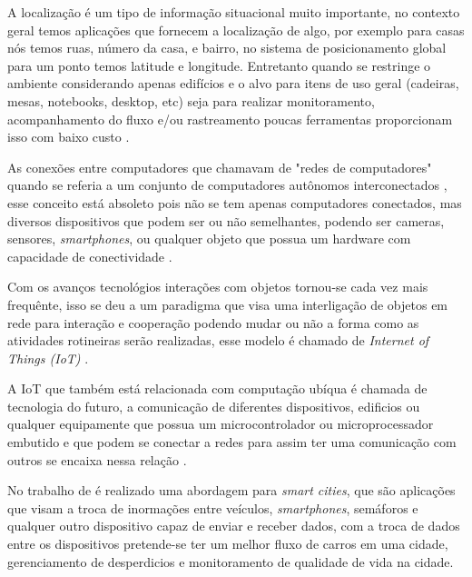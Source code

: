 
A localização é um tipo de informação situacional muito importante, no contexto geral temos aplicações que fornecem a localização de algo, por exemplo para casas nós temos ruas, número da casa, e bairro, no sistema de posicionamento global para um ponto temos  latitude e longitude. Entretanto quando se restringe o ambiente considerando apenas edifícios e o alvo para itens de uso geral (cadeiras, mesas, notebooks, desktop, etc) seja para realizar monitoramento, acompanhamento do fluxo e/ou rastreamento poucas ferramentas proporcionam isso com baixo custo \cite{rfid2009review}.


As  conexões entre computadores que chamavam de 
"redes de computadores" quando se referia a um conjunto de computadores autônomos interconectados \cite{tenenbaum2002}, 
esse conceito está absoleto pois não se tem apenas computadores conectados, mas diversos dispositivos que podem ser ou 
não semelhantes, podendo ser cameras, sensores, \textit{smartphones}, ou qualquer objeto que possua um 
hardware com capacidade de conectividade \cite{iot2016SBRC}.


Com os avanços tecnológios interações com objetos tornou-se cada vez mais frequênte, isso se deu a um paradigma 
que visa uma interligação de objetos em rede para interação e cooperação podendo mudar ou não a forma como as atividades 
rotineiras serão realizadas, esse modelo é chamado de \textit{Internet of Things (IoT)} \cite{realtimeRFID2016}.


A IoT que também está relacionada com computação ubíqua é chamada de tecnologia do futuro, a comunicação de diferentes dispositivos, 
edificios ou qualquer equipamente que possua um microcontrolador ou microprocessador embutido e que podem se conectar a 
redes para assim ter uma comunicação com outros se encaixa nessa relação \cite{mechanismRFID2006}.


No trabalho de \citeauthor{IotMartins} é realizado uma abordagem para \textit{smart cities}, que são aplicações que visam a troca de inormações entre veículos, \textit{smartphones}, semáforos e qualquer outro dispositivo capaz de enviar e receber dados, com a troca de dados entre os dispositivos pretende-se ter um melhor fluxo de carros em uma cidade, gerenciamento de desperdicios e monitoramento de qualidade de vida na cidade. 


